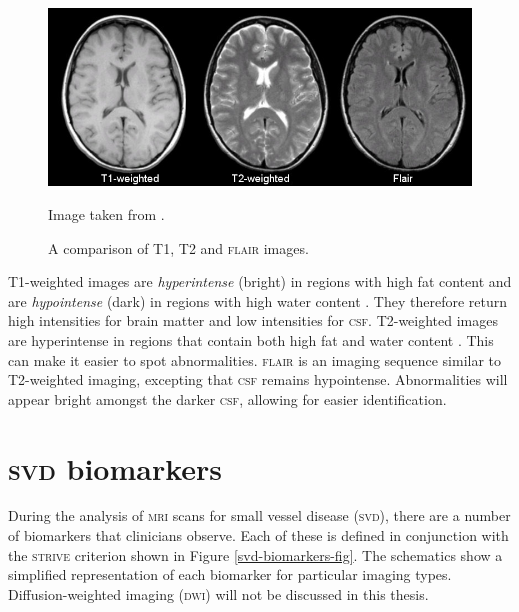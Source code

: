\begin{figure}[ht]
	\centering
	\includegraphics[width=\textwidth]{Images/2_t1_t2_flair.jpg}
	\caption{A comparison of T1, T2 and \textsc{flair} images.}
	\small Image taken from \cite{Preston2006}.
	\label{svd-t1-vs-t2}
\end{figure}

T1-weighted images are \textit{hyperintense} (bright) in regions with high fat content and are \textit{hypointense} (dark) in regions with high water content \citep{Bitar2006}. They therefore return high intensities for brain matter and low intensities for \textsc{csf}. T2-weighted images are hyperintense in regions that contain both high fat and water content \citep{Bitar2006}. This can make it easier to spot abnormalities. \textsc{flair} is an imaging sequence similar to T2-weighted imaging, excepting that \textsc{csf} remains hypointense. Abnormalities will appear bright amongst the darker \textsc{csf}, allowing for easier identification.

\section{\textsc{svd} biomarkers}\label{svd-markers}

During the analysis of \textsc{mri} scans for small vessel disease (\textsc{svd}), there are a number of biomarkers that clinicians observe. Each of these is defined in conjunction with the \textsc{strive} criterion \citep{WardlawJ.M.2013Nsfr} shown in Figure \ref{svd-biomarkers-fig}. The schematics show a simplified representation of each biomarker for particular imaging types. Diffusion-weighted imaging (\textsc{dwi}) will not be discussed in this thesis. 

